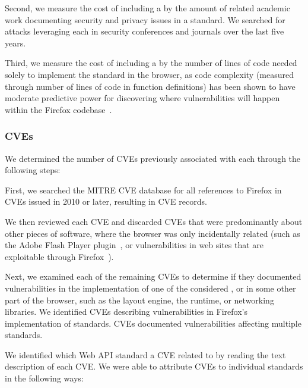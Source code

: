 Second, we measure the cost of including a \WAS by the amount of related academic
work documenting security and privacy issues in a standard.  We searched
for attacks leveraging each \WAS in security conferences and journals over the
last five years.

Third, we measure the cost of including a \WAS by the number of lines of code needed solely to
implement the standard in the browser, as code complexity (measured through number of
lines of code in function definitions) has been shown to have moderate
predictive power for discovering where vulnerabilities will happen within the Firefox
codebase~\cite{shin2011evaluating}.

\subsubsection{CVEs}
\label{cost-benefit:methodology:costs-cves}

We determined the number of CVEs previously associated with each
\WAS through the following steps:

First, we searched the MITRE CVE database for all references to Firefox
in CVEs issued in 2010 or later, resulting in \NumFirefoxCVEs CVE records.

We then reviewed each CVE and discarded \NumFirefoxCVEsOther CVEs that
were predominantly about other pieces of software, where the browser was
only incidentally related (such as the Adobe Flash Player
plugin~\cite{cve_2012_4171}, or vulnerabilities in web sites that are
exploitable through Firefox~\cite{cve_2013_2031}).

Next, we examined each of the remaining CVEs to
determine if they documented vulnerabilities  in the implementation of one of the
\NumStandards considered \WASs, or in some other part of the browser, such as the
layout engine, the \JS runtime, or networking libraries.
We identified \NumFirefoxStandardCVEs CVEs describing vulnerabilities in
Firefox's implementation of \NumStandardsWithCVE standards.
\NumCVEsWithMultipleStandards CVEs documented vulnerabilities affecting multiple
standards.

We identified which Web API standard a CVE related to by reading the text
description of each CVE. We were able to attribute CVEs to individual
standards in the following ways:

